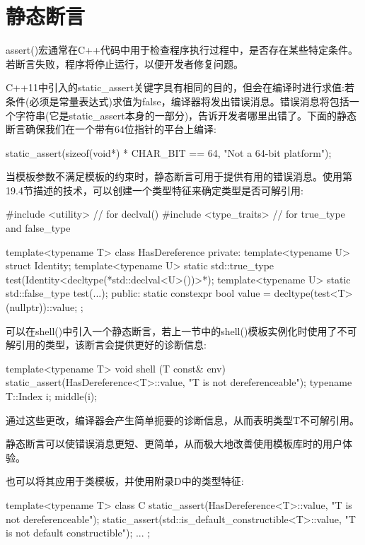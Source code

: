\section{静态断言}
assert()宏通常在C++代码中用于检查程序执行过程中，是否存在某些特定条件。若断言失败，程序将停止运行，以便开发者修复问题。

C++11中引入的static\_assert关键字具有相同的目的，但会在编译时进行求值:若条件(必须是常量表达式)求值为false，编译器将发出错误消息。错误消息将包括一个字符串(它是static\_assert本身的一部分)，告诉开发者哪里出错了。下面的静态断言确保我们在一个带有64位指针的平台上编译:

\begin{cpp}
static_assert(sizeof(void*) * CHAR_BIT == 64, "Not a 64-bit platform");
\end{cpp}

当模板参数不满足模板的约束时，静态断言可用于提供有用的错误消息。使用第19.4节描述的技术，可以创建一个类型特征来确定类型是否可解引用:

\begin{cpp}
#include <utility> // for declval()
#include <type_traits> // for true_type and false_type

template<typename T>
class HasDereference {
	private:
	template<typename U> struct Identity;
	template<typename U> static std::true_type
		test(Identity<decltype(*std::declval<U>())>*);
	template<typename U> static std::false_type
		test(...);
	public:
	static constexpr bool value = decltype(test<T>(nullptr))::value;
};
\end{cpp}

可以在shell()中引入一个静态断言，若上一节中的shell()模板实例化时使用了不可解引用的类型，该断言会提供更好的诊断信息:

\begin{cpp}
template<typename T>
void shell (T const& env)
{
	static_assert(HasDereference<T>::value, "T is not dereferenceable");
	typename T::Index i;
	middle(i);
}
\end{cpp}

通过这些更改，编译器会产生简单扼要的诊断信息，从而表明类型T不可解引用。

静态断言可以使错误消息更短、更简单，从而极大地改善使用模板库时的用户体验。

也可以将其应用于类模板，并使用附录D中的类型特征:

\begin{cpp}
template<typename T>
class C {
	static_assert(HasDereference<T>::value, "T is not dereferenceable");
	static_assert(std::is_default_constructible<T>::value,
				  "T is not default constructible");
	...
};
\end{cpp}




































